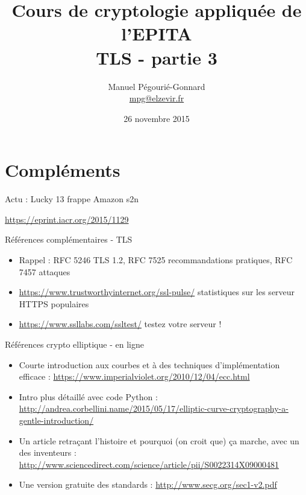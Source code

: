 \documentclass{mpg-ep-slides}
\author[MPG]{Manuel Pégourié-Gonnard\\
  \href{mailto:mpg@elzevir.fr}{{mpg@elzevir.fr}}
}
\institute[ARM]{\normalsize ARM France - IoT - mbed TLS}
\title{Cours de cryptologie appliquée de l'EPITA \\ TLS - partie 3}
\date{26 novembre 2015}
\begin{document}
\lictitle

\section{Compléments}

\begin{frame}{Actu : Lucky 13 frappe Amazon s2n}
  \begin{center}
    \url{https://eprint.iacr.org/2015/1129}
  \end{center}
\end{frame}

\begin{frame}{Références complémentaires - TLS}
  \begin{itemize}
    \item Rappel : RFC 5246 TLS 1.2, RFC 7525 recommandations pratiques, RFC
      7457 attaques
    \item \url{https://www.trustworthyinternet.org/ssl-pulse/} statistiques
      sur les serveur HTTPS populaires
    \item \url{https://www.ssllabs.com/ssltest/} testez votre serveur !
  \end{itemize}
\end{frame}

\begin{frame}{Références crypto elliptique - en ligne}
  \begin{itemize}
    \item Courte introduction aux courbes et à des techniques d'implémentation
      efficace : \url{https://www.imperialviolet.org/2010/12/04/ecc.html}
    \item Intro plus détaillé avec code Python :
      \url{http://andrea.corbellini.name/2015/05/17/elliptic-curve-cryptography-a-gentle-introduction/}
    \item Un article retraçant l'histoire et pourquoi (on croit que) ça
      marche, avec un des inventeurs :
      \url{http://www.sciencedirect.com/science/article/pii/S0022314X09000481}
    \item Une version gratuite des standards :
      \url{http://www.secg.org/sec1-v2.pdf}
  \end{itemize}
\end{frame}
\end{document}
